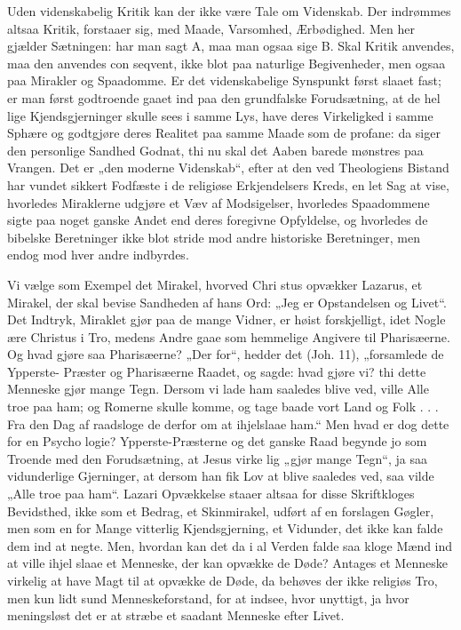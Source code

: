 \documentclass[12pt]{book}
\newcommand{\opage}[1]{\marginnote{\footnotesize\textit{[#1]}}}
\begin{document}
Uden videnskabelig Kritik kan der ikke være Tale
om Videnskab. Der indrømmes altsaa Kritik, forstaaer
sig, med Maade, Varsomhed, Ærbødighed. Men her
gjælder Sætningen: har man sagt A, maa man ogsaa
sige B. Skal Kritik anvendes, maa den anvendes con\-%
seqvent, ikke blot paa naturlige Begivenheder, men ogsaa
paa Mirakler og Spaadomme. Er det videnskabelige
Synspunkt først slaaet fast; er man først godtroende
gaaet ind paa den grundfalske Forudsætning, at de hel\-%
lige Kjendsgjerninger skulle sees i samme Lys, have
deres Virkeligked i samme Sphære og godtgjøre deres
Realitet paa samme Maade som de profane: da siger
den personlige Sandhed Godnat, thi nu skal det Aaben\-%
barede mønstres paa Vrangen. Det er „den moderne
Videnskab“, efter at den ved Theologiens Bistand har
vundet sikkert Fodfæste i de religiøse Erkjendelsers
Kreds, en let Sag at vise, hvorledes Miraklerne udgjøre
et Væv af Modsigelser, hvorledes Spaadommene sigte
paa noget ganske Andet end deres foregivne Opfyldelse,
\opage{84}\setcounter{footnote}{0}%
og hvorledes de bibelske Beretninger ikke blot stride
mod andre historiske Beretninger, men endog mod hver\-%
andre indbyrdes.

Vi vælge som Exempel det Mirakel, hvorved Chri\-%
stus opvækker Lazarus, et Mirakel, der skal bevise
Sandheden af hans Ord: „Jeg er Opstandelsen og
Livet“. Det Indtryk, Miraklet gjør paa de mange
Vidner, er høist forskjelligt, idet Nogle ære Christus i
Tro, medens Andre gaae som hemmelige Angivere til
Pharisæerne. Og hvad gjøre saa Pharisæerne? „Der\-%
for“, hedder det (Joh. 11), „forsamlede de Ypperste-%
Præster og Pharisæerne Raadet, og sagde: hvad gjøre
vi? thi dette Menneske gjør mange Tegn. Dersom vi
lade ham saaledes blive ved, ville Alle troe paa ham;
og Romerne skulle komme, og tage baade vort Land og
Folk . . . Fra den Dag af raadsloge de derfor om at
ihjelslaae ham.“ Men hvad er dog dette for en Psycho\-%
logie? Ypperste-Præsterne og det ganske Raad begynde
jo som Troende med den Forudsætning, at Jesus virke\-%
lig „gjør mange Tegn“, ja saa vidunderlige Gjerninger,
at dersom han fik Lov at blive saaledes ved, saa vilde
„Alle troe paa ham“. Lazari Opvækkelse staaer altsaa
for disse Skriftkloges Bevidsthed, ikke som et Bedrag,
et Skinmirakel, udført af en forslagen Gøgler, men som
en for Mange vitterlig Kjendsgjerning, et Vidunder, det
ikke kan falde dem ind at negte. Men, hvordan kan det
da i al Verden falde saa kloge Mænd ind at ville ihjel\-%
slaae et Menneske, der kan opvække de Døde? Antages
et Menneske virkelig at have Magt til at opvække de
Døde, da behøves der ikke religiøs Tro, men kun lidt
sund Menneskeforstand, for at indsee, hvor unyttigt, ja
hvor meningsløst det er at stræbe et saadant Menneske
efter Livet.
\end{document}
